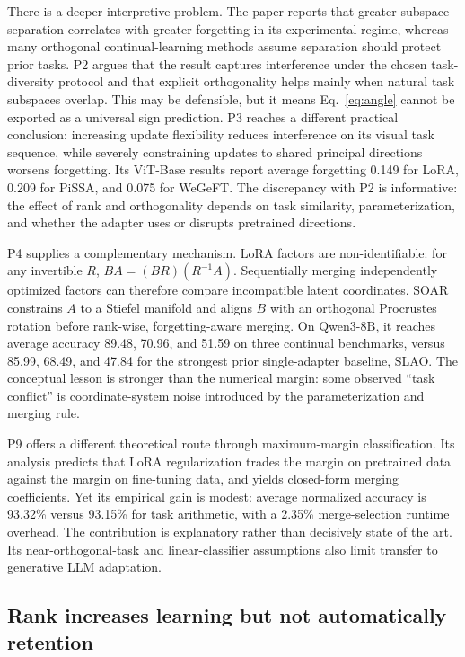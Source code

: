 \documentclass[11pt]{article}
\newcommand{\method}[1]{\textsc{#1}}
\begin{document}
There is a deeper interpretive problem. The paper reports that greater subspace separation correlates with greater forgetting in its experimental regime, whereas many orthogonal continual-learning methods assume separation should protect prior tasks. P2 argues that the result captures interference under the chosen task-diversity protocol and that explicit orthogonality helps mainly when natural task subspaces overlap. This may be defensible, but it means Eq.~\eqref{eq:angle} cannot be exported as a universal sign prediction. P3 reaches a different practical conclusion: increasing update flexibility reduces interference on its visual task sequence, while severely constraining updates to shared principal directions worsens forgetting. Its ViT-Base results report average forgetting 0.149 for LoRA, 0.209 for PiSSA, and 0.075 for WeGeFT. The discrepancy with P2 is informative: the effect of rank and orthogonality depends on task similarity, parameterization, and whether the adapter uses or disrupts pretrained directions.

P4 supplies a complementary mechanism. LoRA factors are non-identifiable: for any invertible $R$, $BA=(BR)(R^{-1}A)$. Sequentially merging independently optimized factors can therefore compare incompatible latent coordinates. \method{SOAR} constrains $A$ to a Stiefel manifold and aligns $B$ with an orthogonal Procrustes rotation before rank-wise, forgetting-aware merging. On Qwen3-8B, it reaches average accuracy 89.48, 70.96, and 51.59 on three continual benchmarks, versus 85.99, 68.49, and 47.84 for the strongest prior single-adapter baseline, SLAO. The conceptual lesson is stronger than the numerical margin: some observed ``task conflict'' is coordinate-system noise introduced by the parameterization and merging rule.

P9 offers a different theoretical route through maximum-margin classification. Its analysis predicts that LoRA regularization trades the margin on pretrained data against the margin on fine-tuning data, and yields closed-form merging coefficients. Yet its empirical gain is modest: average normalized accuracy is 93.32\% versus 93.15\% for task arithmetic, with a 2.35\% merge-selection runtime overhead. The contribution is explanatory rather than decisively state of the art. Its near-orthogonal-task and linear-classifier assumptions also limit transfer to generative LLM adaptation.

\subsection{Rank increases learning but not automatically retention}
\end{document}
